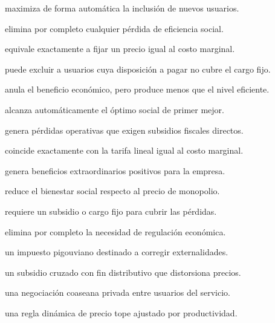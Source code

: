 \begin{opts}
    \item maximiza de forma automática la inclusión de nuevos usuarios.
    \item elimina por completo cualquier pérdida de eficiencia social.
    \item equivale exactamente a fijar un precio igual al costo marginal.
    \item puede excluir a usuarios cuya disposición a pagar no cubre el cargo fijo.
\end{opts}

\begin{opts}
    \item anula el beneficio económico, pero produce menos que el nivel eficiente.
    \item alcanza automáticamente el óptimo social de primer mejor.
    \item genera pérdidas operativas que exigen subsidios fiscales directos.
    \item coincide exactamente con la tarifa lineal igual al costo marginal.
\end{opts}

\begin{opts}
    \item genera beneficios extraordinarios positivos para la empresa.
    \item reduce el bienestar social respecto al precio de monopolio.
    \item requiere un subsidio o cargo fijo para cubrir las pérdidas.
    \item elimina por completo la necesidad de regulación económica.
\end{opts}

\begin{opts}
    \item un impuesto pigouviano destinado a corregir externalidades.
    \item un subsidio cruzado con fin distributivo que distorsiona precios.
    \item una negociación coaseana privada entre usuarios del servicio.
    \item una regla dinámica de precio tope ajustado por productividad.
\end{opts}

